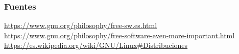 \documentclass[12pt]{beamer}
\begin{document}
\begin{frame}
\end{frame}

\begin{frame}
  \frametitle{Fuentes}
  \url{https://www.gnu.org/philosophy/free-sw.es.html}
  \url{https://www.gnu.org/philosophy/free-software-even-more-important.html}
  \url{https://es.wikipedia.org/wiki/GNU/Linux#Distribuciones}
  
\end{frame}
\end{document}

